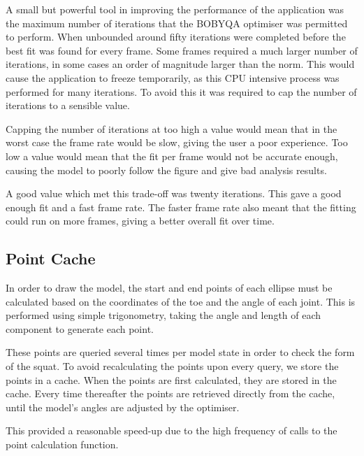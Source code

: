 A small but powerful tool in improving the performance of the application was the maximum number of iterations that the BOBYQA optimiser was permitted to perform. When unbounded around fifty iterations were completed before the best fit was found for every frame. Some frames required a much larger number of iterations, in some cases an order of magnitude larger than the norm. This would cause the application to freeze temporarily, as this CPU intensive process was performed for many iterations. To avoid this it was required to cap the number of iterations to a sensible value.

Capping the number of iterations at too high a value would mean that in the worst case the frame rate would be slow, giving the user a poor experience. Too low a value would mean that the fit per frame would not be accurate enough, causing the model to poorly follow the figure and give bad analysis results.

A good value which met this trade-off was twenty iterations. This gave a good enough fit and a fast frame rate. The faster frame rate also meant that the fitting could run on more frames, giving a better overall fit over time.

\subsection{Point Cache}

In order to draw the model, the start and end points of each ellipse must be calculated based on the coordinates of the toe and the angle of each joint. This is performed using simple trigonometry, taking the angle and length of each component to generate each point.

These points are queried several times per model state in order to check the form of the squat. To avoid recalculating the points upon every query, we store the points in a cache. When the points are first calculated, they are stored in the cache. Every time thereafter the points are retrieved directly from the cache, until the model's angles are adjusted by the optimiser.

This provided a reasonable speed-up due to the high frequency of calls to the point calculation function.